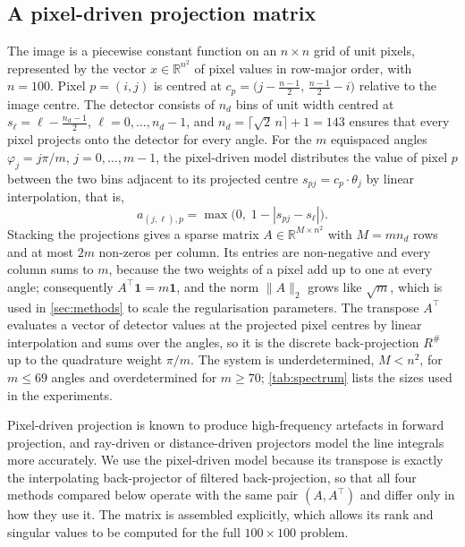 \documentclass[11pt,a4paper]{article}
\numberwithin{equation}{section}
\theoremstyle{remark}
\newcommand{\R}{\mathbb{R}}
\newcommand{\T}{\top}
\begin{document}
\subsection{A pixel-driven projection matrix}\label{sec:discrete-matrix}

The image is a piecewise constant function on an $n\times n$ grid of unit pixels, represented by the vector $x\in\R^{n^2}$ of pixel values in row-major order, with $n=100$. Pixel $p=(i,j)$ is centred at $c_p=\bigl(j-\tfrac{n-1}{2},\,\tfrac{n-1}{2}-i\bigr)$ relative to the image centre. The detector consists of $n_d$ bins of unit width centred at $s_\ell=\ell-\tfrac{n_d-1}{2}$, $\ell=0,\dots,n_d-1$, and $n_d=\lceil\sqrt2\,n\rceil+1=143$ ensures that every pixel projects onto the detector for every angle. For the $m$ equispaced angles $\varphi_j=j\pi/m$, $j=0,\dots,m-1$, the pixel-driven model distributes the value of pixel $p$ between the two bins adjacent to its projected centre $s_{pj}=c_p\cdot\theta_j$ by linear interpolation, that is,
\begin{equation}\label{eq:matrix}
  a_{(j,\ell),p}=\max\bigl(0,\;1-|s_{pj}-s_\ell|\bigr).
\end{equation}
Stacking the projections gives a sparse matrix $A\in\R^{M\times n^2}$ with $M=mn_d$ rows and at most $2m$ non-zeros per column. Its entries are non-negative and every column sums to $m$, because the two weights of a pixel add up to one at every angle; consequently $A^\T\mathbf 1=m\mathbf 1$, and the norm $\|A\|_2$ grows like $\sqrt m$, which is used in \cref{sec:methods} to scale the regularisation parameters. The transpose $A^\T$ evaluates a vector of detector values at the projected pixel centres by linear interpolation and sums over the angles, so it is the discrete back-projection $R^\#$ up to the quadrature weight $\pi/m$. The system is underdetermined, $M<n^2$, for $m\le69$ angles and overdetermined for $m\ge70$; \cref{tab:spectrum} lists the sizes used in the experiments.

Pixel-driven projection is known to produce high-frequency artefacts in forward projection, and ray-driven \citep{siddon1985} or distance-driven \citep{deman2004} projectors model the line integrals more accurately. We use the pixel-driven model because its transpose is exactly the interpolating back-projector of filtered back-projection, so that all four methods compared below operate with the same pair $(A,A^\T)$ and differ only in how they use it. The matrix is assembled explicitly, which allows its rank and singular values to be computed for the full $100\times100$ problem.
\end{document}
